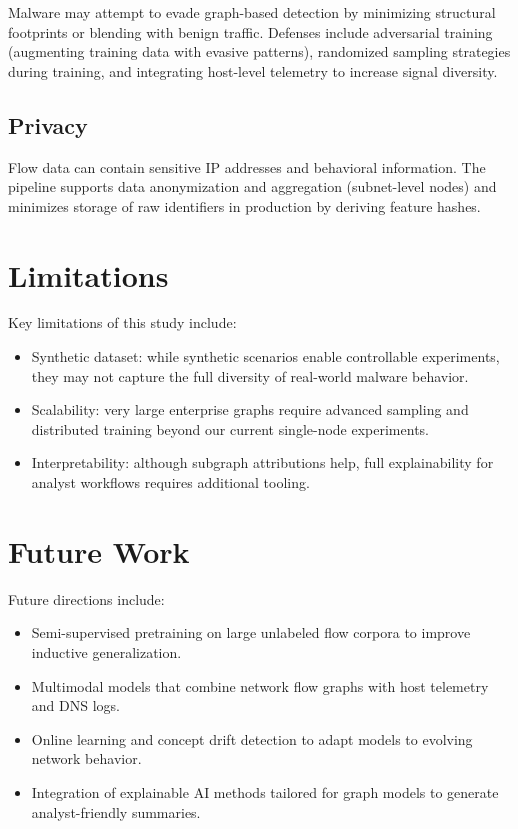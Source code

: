 \documentclass[conference]{IEEEtran}
\begin{document}
Malware may attempt to evade graph-based detection by minimizing structural footprints or blending with benign traffic. Defenses include adversarial training (augmenting training data with evasive patterns), randomized sampling strategies during training, and integrating host-level telemetry to increase signal diversity.

\subsection{Privacy}

Flow data can contain sensitive IP addresses and behavioral information. The pipeline supports data anonymization and aggregation (subnet-level nodes) and minimizes storage of raw identifiers in production by deriving feature hashes.

\section{Limitations}

Key limitations of this study include:

\begin{itemize}
	\item Synthetic dataset: while synthetic scenarios enable controllable experiments, they may not capture the full diversity of real-world malware behavior.
	\item Scalability: very large enterprise graphs require advanced sampling and distributed training beyond our current single-node experiments.
	\item Interpretability: although subgraph attributions help, full explainability for analyst workflows requires additional tooling.
\end{itemize}

\section{Future Work}

Future directions include:

\begin{itemize}
	\item Semi-supervised pretraining on large unlabeled flow corpora to improve inductive generalization.
	\item Multimodal models that combine network flow graphs with host telemetry and DNS logs.
	\item Online learning and concept drift detection to adapt models to evolving network behavior.
	\item Integration of explainable AI methods tailored for graph models to generate analyst-friendly summaries.
\end{itemize}
\end{document}
